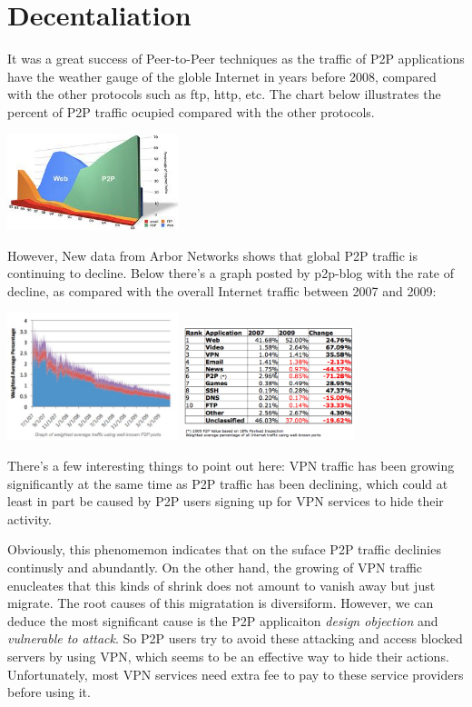 \section{Decentaliation}
{
It was a great success of Peer-to-Peer techniques as the traffic of P2P applications have the weather gauge of the globle Internet in years before 2008, compared with the other protocols such as ftp, http, etc. 
The chart below illustrates the percent of P2P traffic ocupied compared with the other protocols.
\begin{center}
\includegraphics[width=5cm]{data/p2ptraffic.jpg}
\end{center}

However, New data from Arbor Networks shows that global P2P traffic is continuing to decline. 
Below there’s a graph posted by p2p-blog with the rate of decline, as compared with the overall Internet traffic between 2007 and 2009:
\begin{center}  
\includegraphics[width=5cm]{data/Arbor-Networks-graph-of-p2p-decline.jpg}
\includegraphics[width=5cm]{data/arbornetworks2-2.png}
\end{center}

There's a few interesting things to point out here: VPN traffic has been growing significantly at the same time as P2P traffic has been declining, which could at least in part be caused by P2P users signing up for VPN services to hide their activity.\cite{p2ptrafficdecline}

Obviously, this phenomemon indicates that on the suface P2P traffic declinies continusly and abundantly. On the other hand, the growing of VPN traffic enucleates that this kinds of shrink does not amount to vanish away but just migrate.
The root causes of this migratation is diversiform. 
However, we can deduce the most significant cause is the P2P applicaiton \emph{design objection} and \emph{vulnerable to attack}. 
So P2P users try to avoid these attacking and access blocked servers by using VPN, which seems to be an effective way to hide their actions. 
Unfortunately, most VPN services need extra fee to pay to these service providers before using it.
}

